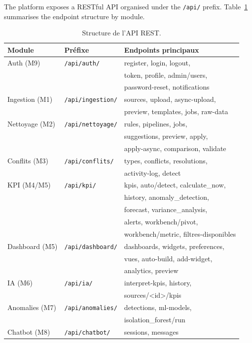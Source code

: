 \noindent
The platform exposes a RESTful API
organised under the \texttt{/api/} prefix.
Table~\ref{tab:api} summarises the endpoint structure
by module.

\begin{table}[h!]
\centering
\caption{Structure de l'API REST.}
\label{tab:api}
\small
\begin{tabular}{|l|l|l|}
\hline
\textbf{Module} & \textbf{Préfixe} & \textbf{Endpoints principaux} \\
\hline
Auth (M9) & \texttt{/api/auth/} & register, login, logout, \\
& & token, profile, admin/users, \\
& & password-reset, notifications \\
\hline
Ingestion (M1) & \texttt{/api/ingestion/} & sources, upload, async-upload, \\
& & preview, templates, jobs, raw-data \\
\hline
Nettoyage (M2) & \texttt{/api/nettoyage/} & rules, pipelines, jobs, \\
& & suggestions, preview, apply, \\
& & apply-async, comparison, validate \\
\hline
Conflits (M3) & \texttt{/api/conflits/} & types, conflicts, resolutions, \\
& & activity-log, detect \\
\hline
KPI (M4/M5) & \texttt{/api/kpi/} & kpis, auto/detect, calculate\_now, \\
& & history, anomaly\_detection, \\
& & forecast, variance\_analysis, \\
& & alerts, workbench/pivot, \\
& & workbench/metric, filtres-disponibles \\
\hline
Dashboard (M5) & \texttt{/api/dashboard/} & dashboards, widgets, preferences, \\
& & vues, auto-build, add-widget, \\
& & analytics, preview \\
\hline
IA (M6) & \texttt{/api/ia/} & interpret-kpis, history, \\
& & sources/<id>/kpis \\
\hline
Anomalies (M7) & \texttt{/api/anomalies/} & detections, ml-models, \\
& & isolation\_forest/run \\
\hline
Chatbot (M8) & \texttt{/api/chatbot/} & sessions, messages \\
\hline
\end{tabular}
\end{table}

